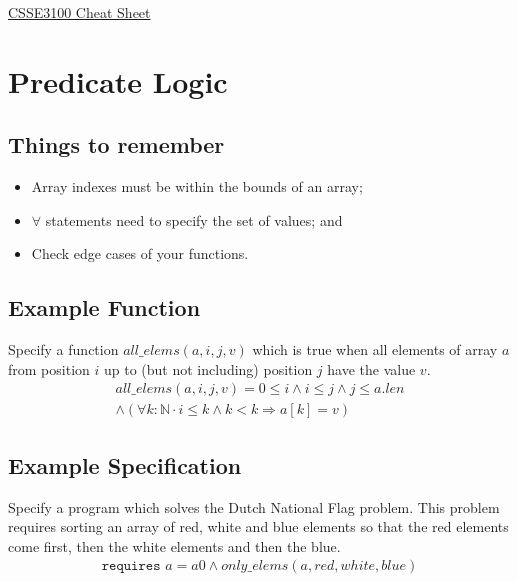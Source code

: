 \documentclass[landscape]{cheat}
\begin{document}
\footnotesize
\begin{multicols*}{3}

\begin{center}
\Large{\underline{CSSE3100 Cheat Sheet}} \\
\end{center}

\section{Predicate Logic}

\subsection{Things to remember}
\begin{itemize}
    \item Array indexes must be within the bounds of an array;
    \item $\forall$ statements need to specify the set of values; and
    \item Check edge cases of your functions.
\end{itemize}

\subsection{Example Function}
Specify a function $all\_elems(a, i, j, v)$ which is true when all elements of array $a$ from position $i$ up to (but not including) position $j$ have the value $v$.
\begin{multline*}
all\_elems(a, i, j, v) =
    0 \leq i
    \land i \leq j
    \land j \leq a.len \\
    \land (\forall k : \mathbb{N} \cdot
        i \leq k
        \land k < k
        \Rightarrow a[k] = v
    )
\end{multline*}

\subsection{Example Specification}
Specify a program which solves the Dutch National Flag problem.
This problem requires sorting an array of red, white and blue elements so that the red elements come first, then the white elements and then the blue.
\begin{multline*}
\texttt{requires } a = a0 \land only\_elems(a, red, white, blue) \\
\end{multline*}


\end{multicols*}
\end{document}
